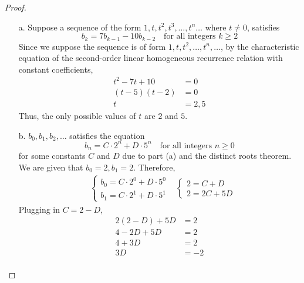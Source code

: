 \begin{proof}
    \begin{enumerate}
        \item[a.] 
            Suppose a sequence of the form $1,t,t^2,t^3, \ldots, t^n \ldots$ where $t \neq 0$, satisfies 
            \begin{equation*}
                b_k = 7b_{k-1} - 10b_{k-2} \quad \text{for all integers $k \geq 2$}
            \end{equation*}
            Since we suppose the sequence is of form $1, t, t^2, \ldots, t^n, \ldots$, by the characteristic equation of the second-order linear homogeneous recurrence relation with constant coefficients, 
            \begin{align*}
                t^2 - 7t + 10 &= 0 \\
                (t - 5)(t - 2) &= 0 \\
                t &= 2, 5
            \end{align*}
            Thus, the only possible values of $t$ are $2$ and $5$.
        \item[b.] 
            $b_0, b_1, b_2, \ldots$ satisfies the equation
            \begin{equation*}
                b_n = C\cdot 2^n + D\cdot 5^n \quad \text{for all integers $n \geq 0$}
            \end{equation*}
            for some constants $C$ and $D$ due to part (a) and the distinct roots theorem. We are given that $b_0 = 2, b_1 = 2$. Therefore, 
            \begin{align*}
                &\begin{cases} 
                    b_0 = C \cdot 2^0 + D \cdot 5^0 \\
                    b_1 = C \cdot 2^1 + D \cdot 5^1
                \end{cases}
                &\begin{cases} 
                    2 = C + D \\ 
                    2 = 2C + 5D
                \end{cases}
            \end{align*}
            Plugging in $C = 2 - D$, 
            \begin{align*}
                2(2 - D) + 5D &= 2 \\
                4 - 2D + 5D &= 2 \\
                4 + 3D &= 2 \\
                3D &= -2 \\

\end{align*}
\end{enumerate}
\end{proof}
